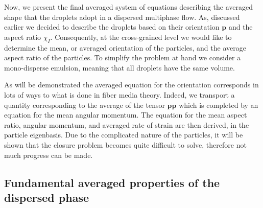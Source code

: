 
Now, we present the final averaged system of equations describing the averaged shape that the droplets adopt in a dispersed multiphase flow. 
As, discussed earlier we decided to describe the droplets based on their orientation $\textbf{p}$ and the aspect ratio $\chi_I$.
Consequently, at the cross-grained level we would like to determine the mean, or averaged orientation of the particles, and the average aspect ratio of the particles.  
To simplify the problem at hand we consider a mono-disperse emulsion, meaning that all droplets have the same volume. 

As will be demonstrated the averaged equation for the orientation corresponds in lots of ways to what is done in fiber media theory. 
Indeed, we transport a quantity corresponding to the average of the tensor $\textbf{pp}$ which is completed by an equation for the mean angular momentum. 
The equation for the mean aspect ratio, angular momentum, and averaged rate of strain are then derived, in the particle eigenbasis.
Due to the complicated nature of the particles, it will be shown that the closure problem becomes quite difficult to solve, therefore not much progress can be made. 

\subsection{Fundamental averaged properties of the dispersed phase} 

